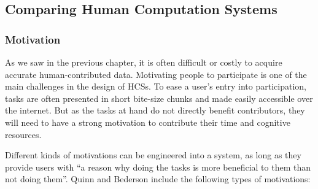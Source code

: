 \subsection{Comparing Human Computation Systems} %
\label{sub:comparing_systems}

\subsubsection{Motivation}
As we saw in the previous chapter, it is often difficult or costly to acquire accurate human-contributed data. Motivating people to participate is one of the main challenges in the design of HCSs. To ease a user's entry into participation, tasks are often presented in short bite-size chunks and made easily accessible over the internet. But as the tasks at hand do not directly benefit contributors, they will need to have a strong motivation to contribute their time and cognitive resources.

Different kinds of motivations can be engineered into a system, as long as they provide users with ``a reason why doing the tasks is more beneficial to them than not doing them''\cite{Quinn:2011us}. Quinn and Bederson include the following types of motivations: 

